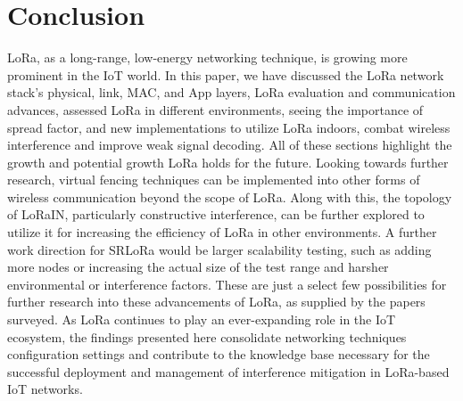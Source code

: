 \documentclass[sigsmall]{acmart}
\begin{document}
\section*{Conclusion}
LoRa, as a long-range, low-energy networking technique, is growing more prominent in the IoT world. In this paper, we have discussed the LoRa network stack’s physical, link, MAC, and App layers, LoRa evaluation and communication advances, assessed LoRa in different environments, seeing the importance of spread factor, and new implementations to utilize LoRa indoors, combat wireless interference and improve weak signal decoding. All of these sections highlight the growth and potential growth LoRa holds for the future. Looking towards further research, virtual fencing techniques can be implemented into other forms of wireless communication beyond the scope of LoRa. Along with this, the topology of LoRaIN, particularly constructive interference, can be further explored to utilize it for increasing the efficiency of LoRa in other environments. A further work direction for SRLoRa would be larger scalability testing, such as adding more nodes or increasing the actual size of the test range and harsher environmental or interference factors. These are just a select few possibilities for further research into these advancements of LoRa, as supplied by the papers surveyed. As LoRa continues to play an ever-expanding role in the IoT ecosystem, the findings presented here consolidate networking techniques configuration settings and contribute to the knowledge base necessary for the successful deployment and management of interference mitigation in LoRa-based IoT networks.



\end{document}
